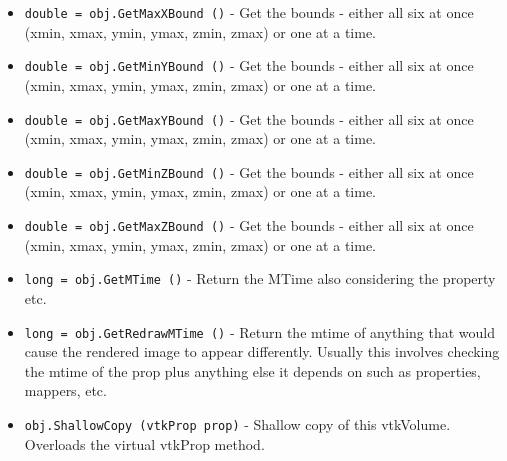\begin{itemize}
\item  \verb|double = obj.GetMaxXBound ()| -  Get the bounds - either all six at once 
 (xmin, xmax, ymin, ymax, zmin, zmax) or one at a time.

\item  \verb|double = obj.GetMinYBound ()| -  Get the bounds - either all six at once 
 (xmin, xmax, ymin, ymax, zmin, zmax) or one at a time.

\item  \verb|double = obj.GetMaxYBound ()| -  Get the bounds - either all six at once 
 (xmin, xmax, ymin, ymax, zmin, zmax) or one at a time.

\item  \verb|double = obj.GetMinZBound ()| -  Get the bounds - either all six at once 
 (xmin, xmax, ymin, ymax, zmin, zmax) or one at a time.

\item  \verb|double = obj.GetMaxZBound ()| -  Get the bounds - either all six at once 
 (xmin, xmax, ymin, ymax, zmin, zmax) or one at a time.

\item  \verb|long = obj.GetMTime ()| -  Return the MTime also considering the property etc.

\item  \verb|long = obj.GetRedrawMTime ()| -  Return the mtime of anything that would cause the rendered image to 
 appear differently. Usually this involves checking the mtime of the 
 prop plus anything else it depends on such as properties, mappers,
 etc.

\item  \verb|obj.ShallowCopy (vtkProp prop)| -  Shallow copy of this vtkVolume. Overloads the virtual vtkProp method.

\end{itemize}
